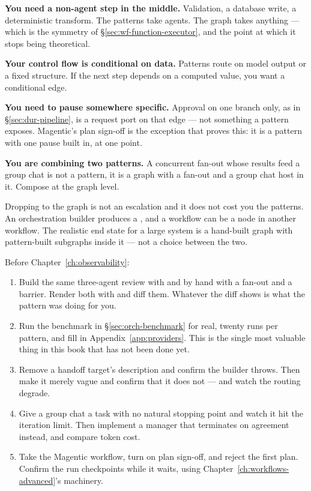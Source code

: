 \textbf{You need a non-agent step in the middle.} Validation, a database write, a
deterministic transform. The patterns take agents. The graph takes anything ---
which is the symmetry of \S\ref{sec:wf-function-executor}, and the point at which
it stops being theoretical.

\textbf{Your control flow is conditional on data.} Patterns route on model output
or a fixed structure. If the next step depends on a computed value, you want a
conditional edge.

\textbf{You need to pause somewhere specific.} Approval on one branch only, as in
\S\ref{sec:dur-pipeline}, is a request port on that edge --- not something a
pattern exposes. Magentic's plan sign-off is the exception that proves this: it
is a pattern with one pause built in, at one point.

\textbf{You are combining two patterns.} A concurrent fan-out whose results feed
a group chat is not a pattern, it is a graph with a fan-out and a group chat host
in it. Compose at the graph level.

\begin{note}
Dropping to the graph is not an escalation and it does not cost you the patterns.
An orchestration builder produces a , and a workflow can be a node
in another workflow. The realistic end state for a large system is a hand-built
graph with pattern-built subgraphs inside it --- not a choice between the two.
\end{note}

\begin{exercisebox}
Before Chapter~\ref{ch:observability}:

\begin{enumerate}[leftmargin=1.4em]
\item Build the same three-agent review with  and by hand
      with a fan-out and a barrier. Render both with
       and diff them. Whatever the diff shows is what the
      pattern was doing for you.
\item Run the benchmark in \S\ref{sec:orch-benchmark} for real, twenty runs per
      pattern, and fill in Appendix~\ref{app:providers}. This is the single most
      valuable thing in this book that has not been done yet.
\item Remove a handoff target's description and confirm the builder throws. Then
      make it merely vague and confirm that it does not --- and watch the routing
      degrade.
\item Give a group chat a task with no natural stopping point and watch it hit
      the iteration limit. Then implement a manager that terminates on agreement
      instead, and compare token cost.
\item Take the Magentic workflow, turn on plan sign-off, and reject the first
      plan. Confirm the run checkpoints while it waits, using
      Chapter~\ref{ch:workflows-advanced}'s machinery.
\end{enumerate}
\end{exercisebox}

